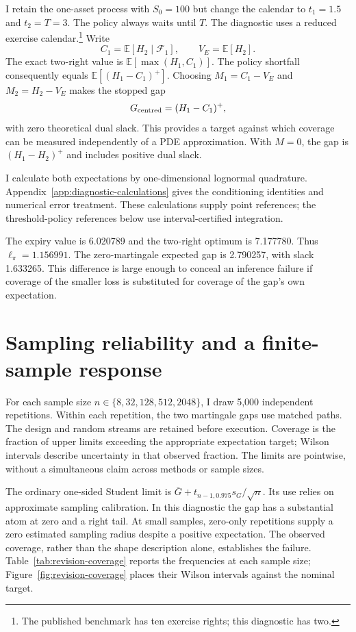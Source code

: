 \documentclass[11pt]{article}
\newcommand{\E}{\mathbb E}
\newcommand{\F}{\mathcal F}
\begin{document}
I retain the one-asset process with $S_0=100$ but change the calendar to $t_1=1.5$ and $t_2=T=3$. The policy always waits until $T$. The diagnostic uses a reduced exercise calendar.\footnote{The published benchmark has ten exercise rights; this diagnostic has two.} Write
\begin{equation}
 C_1=\E[H_2\mid\F_1],\qquad V_E=\E[H_2].
\end{equation}
The exact two-right value is $\E[\max(H_1,C_1)]$. The policy shortfall consequently equals $\E[(H_1-C_1)^+]$. Choosing $M_1=C_1-V_E$ and $M_2=H_2-V_E$ makes the stopped gap
\begin{equation}
 G_{\rm centred}=(H_1-C_1)^+,
\label{eq:exactgap}
\end{equation}
with zero theoretical dual slack. This provides a target against which coverage can be measured independently of a PDE approximation. With $M=0$, the gap is $(H_1-H_2)^+$ and includes positive dual slack.

I calculate both expectations by one-dimensional lognormal quadrature. Appendix~\ref{app:diagnostic-calculations} gives the conditioning identities and numerical error treatment. These calculations supply point references; the threshold-policy references below use interval-certified integration.

The expiry value is 6.020789 and the two-right optimum is 7.177780. Thus $\ell_\pi=1.156991$. The zero-martingale expected gap is 2.790257, with slack 1.633265. This difference is large enough to conceal an inference failure if coverage of the smaller loss is substituted for coverage of the gap's own expectation.

\section{Sampling reliability and a finite-sample response}
\label{sec:coverage}

For each sample size $n\in\{8,32,128,512,2048\}$, I draw 5,000 independent repetitions. Within each repetition, the two martingale gaps use matched paths. The design and random streams are retained before execution. Coverage is the fraction of upper limits exceeding the appropriate expectation target; Wilson intervals describe uncertainty in that observed fraction. The limits are pointwise, without a simultaneous claim across methods or sample sizes.

The ordinary one-sided Student limit is $\bar G+t_{n-1,0.975}s_G/\sqrt n$. Its use relies on approximate sampling calibration. In this diagnostic the gap has a substantial atom at zero and a right tail. At small samples, zero-only repetitions supply a zero estimated sampling radius despite a positive expectation. The observed coverage, rather than the shape description alone, establishes the failure. Table~\ref{tab:revision-coverage} reports the frequencies at each sample size; Figure~\ref{fig:revision-coverage} places their Wilson intervals against the nominal target.
\end{document}
